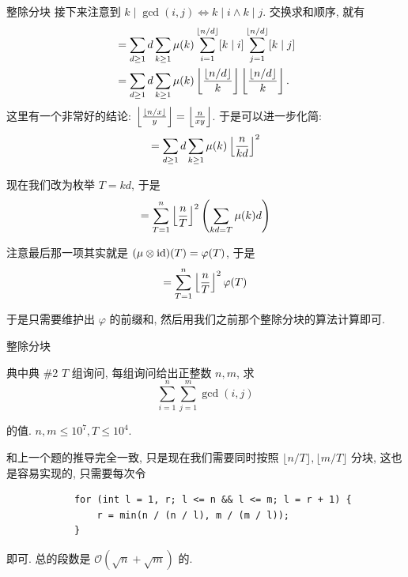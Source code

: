\documentclass{beamer}
\begin{document}
    \begin{frame}{整除分块}
        接下来注意到 $k\mid\gcd(i,j)\iff k\mid i\land k\mid j$. 交换求和顺序, 就有
        \begin{align*}
            &=\sum_{d\geq 1}d\sum_{k\geq 1}\mu(k)\sum_{i=1}^{\lfloor n/d\rfloor}[k\mid i]\sum_{j=1}^{\lfloor n/d\rfloor}[k\mid j]\\
            &=\sum_{d\geq 1}d\sum_{k\geq 1}\mu(k)\left\lfloor\lfloor n/d\rfloor\over k\right\rfloor\left\lfloor\lfloor n/d\rfloor\over k\right\rfloor.
        \end{align*}
        这里有一个非常好的结论: $\left\lfloor\lfloor n/x\rfloor\over y\right\rfloor=\left\lfloor n\over xy\right\rfloor$. 于是可以进一步化简:
        $$
        =\sum_{d\geq 1}d\sum_{k\geq 1}\mu(k)\left\lfloor n\over kd\right\rfloor^2
        $$

        现在我们改为枚举 $T=kd$, 于是
        $$
        =\sum_{T=1}^n\left\lfloor n\over T\right\rfloor^2\left(\sum_{kd=T}\mu(k)d\right)
        $$

        注意最后那一项其实就是 $(\mu\otimes{\rm id})(T)=\varphi(T)$, 于是
        $$
        =\sum_{T=1}^n\left\lfloor n\over T\right\rfloor^2\varphi(T)
        $$

        于是只需要维护出 $\varphi$ 的前缀和, 然后用我们之前那个整除分块的算法计算即可.
    \end{frame}

    \begin{frame}[fragile]{整除分块}
        \begin{block}{典中典 \#2}
            $T$ 组询问, 每组询问给出正整数 $n,m$, 求
            $$
            \sum_{i=1}^n\sum_{j=1}^m\gcd(i,j)
            $$

            的值. $n,m\leq 10^7,T\leq 10^4$.
        \end{block}
        \pause
        和上一个题的推导完全一致, 只是现在我们需要同时按照 $\lfloor n/T\rfloor,\lfloor m/T\rfloor$ 分块, 这也是容易实现的, 只需要每次令
        \begin{lstlisting}
            for (int l = 1, r; l <= n && l <= m; l = r + 1) {
                r = min(n / (n / l), m / (m / l));
            }\end{lstlisting}
        即可. 总的段数是 $\mathcal O(\sqrt n+\sqrt m)$ 的.
    \end{frame}
\end{document}
